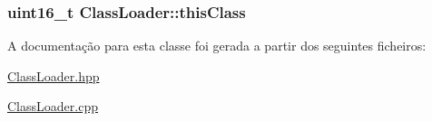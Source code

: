 \subsubsection[{\texorpdfstring{this\+Class}{thisClass}}]{\setlength{\rightskip}{0pt plus 5cm}uint16\+\_\+t Class\+Loader\+::this\+Class\hspace{0.3cm}{\ttfamily [private]}}\hypertarget{class_class_loader_ab4ec421aef6d619f8e2ae86ea08d62f2}{}\label{class_class_loader_ab4ec421aef6d619f8e2ae86ea08d62f2}


A documentação para esta classe foi gerada a partir dos seguintes ficheiros\+:\begin{DoxyCompactItemize}
\item 
\hyperlink{_class_loader_8hpp}{Class\+Loader.\+hpp}\item 
\hyperlink{_class_loader_8cpp}{Class\+Loader.\+cpp}\end{DoxyCompactItemize}

